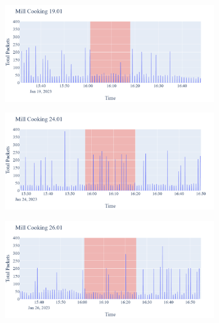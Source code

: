 \begin{figure}[H]
\begin{subfigure}[b]{0.47\textwidth}
    \end{subfigure}
    \begin{subfigure}[b]{0.47\textwidth}
        \centering
        \includegraphics[width=1.2\hsize]{figures/Mill_Cooking_Packets_19.01.png}
    \end{subfigure}
    \begin{subfigure}[b]{0.47\textwidth}
        \centering
        \includegraphics[width=1.2\hsize]{figures/Mill_Cooking_Packets_24.01.png}
    \end{subfigure}
    \begin{subfigure}[b]{0.47\textwidth}
        \centering
        \includegraphics[width=1.2\hsize]{figures/Mill_Cooking_Packets_26.01.png}
    \end{subfigure}
    \begin{subfigure}[b]{0.47\textwidth}

\end{subfigure}
\end{figure}
